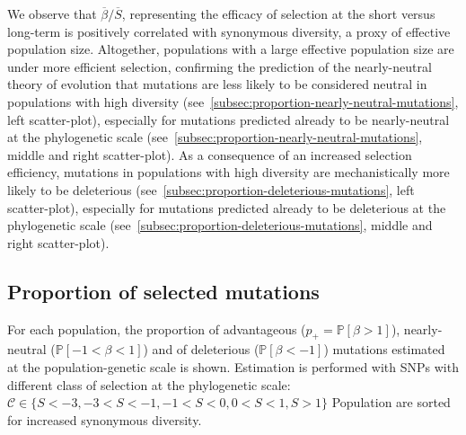 \documentclass{article}
\newcommand{\proba}{\mathbb{P}}
\newcommand{\Sphy}{S}
\newcommand{\Sphyclass}{\mathcal{C}}
\newcommand{\SphyMean}{\overline{\Sphy}}
\newcommand{\divStrongDel}{\Sphy < -3}
\newcommand{\divDel}{-3 < \Sphy < -1}
\newcommand{\divWeakDel}{-1 < \Sphy < 0}
\newcommand{\divWeakAdv}{0 < \Sphy < 1}
\newcommand{\divAdv}{ \Sphy > 1}
\newcommand{\Spop}{\beta}
\newcommand{\SpopMean}{\overline{\Spop}}
\newcommand{\polyDel}{\Spop < -1}
\newcommand{\polyNeutral}{-1 < \Spop < 1}
\newcommand{\polyAdv}{ \Spop > 1}
\newcommand{\PpolyDel}{\proba \left[ \polyDel \right]}
\newcommand{\PpolyNeutral}{\proba \left[ \polyNeutral \right]}
\newcommand{\PpolyAdv}{\proba \left[ \polyAdv \right]}
\begin{document}
    We observe that $\SpopMean/\SphyMean$, representing the efficacy of selection at the short versus long-term is positively correlated with synonymous diversity, a proxy of effective population size.
    Altogether, populations with a large effective population size are under more efficient selection, confirming the prediction of the nearly-neutral theory of evolution that mutations are less likely to be considered neutral in populations with high diversity (see~\ref{subsec:proportion-nearly-neutral-mutations}, left scatter-plot), especially for mutations predicted already to be nearly-neutral at the phylogenetic scale (see~\ref{subsec:proportion-nearly-neutral-mutations}, middle and right scatter-plot).
    As a consequence of an increased selection efficiency, mutations in populations with high diversity are mechanistically more likely to be deleterious (see~\ref{subsec:proportion-deleterious-mutations}, left scatter-plot), especially for mutations predicted already to be deleterious at the phylogenetic scale (see~\ref{subsec:proportion-deleterious-mutations}, middle and right scatter-plot).

    \newpage

    \subsection{Proportion of selected mutations}

    For each population, the proportion of advantageous ($p_+=\PpolyAdv$), nearly-neutral ($\PpolyNeutral$) and of deleterious ($\PpolyDel$) mutations estimated at the population-genetic scale is shown.
    Estimation is performed with SNPs with different class of selection at the phylogenetic scale: $\Sphyclass \in \{ \divStrongDel, \divDel, \divWeakDel, \divWeakAdv, \divAdv \}$
    Population are sorted for increased synonymous diversity.
\end{document}
